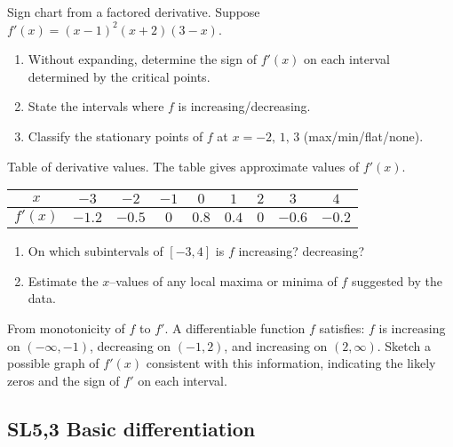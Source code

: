 \documentclass[11pt]{article}
\def\textbf#1{#1}%
\newcommand{\tocsubsection}[1]{\subsection{#1}}
\newcounter{question}
\begin{document}
\begin{question}
\textbf{Sign chart from a factored derivative.}
Suppose $f'(x)=(x-1)^{2}(x+2)(3-x)$.
\begin{enumerate}
  \item Without expanding, determine the sign of $f'(x)$ on each interval determined by the critical points.
  \item State the intervals where $f$ is increasing/decreasing.
  \item Classify the stationary points of $f$ at $x=-2,\,1,\,3$ (max/min/flat/none).
\end{enumerate}
\end{question}

\begin{question}
\textbf{Table of derivative values.}
The table gives approximate values of $f'(x)$.

\begin{center}
\begin{tabular}{c|cccccccc}
$x$ & $-3$ & $-2$ & $-1$ & $0$ & $1$ & $2$ & $3$ & $4$\\\hline
$f'(x)$ & $-1.2$ & $-0.5$ & $0$ & $0.8$ & $0.4$ & $0$ & $-0.6$ & $-0.2$
\end{tabular}
\end{center}

\begin{enumerate}
  \item On which subintervals of $[-3,4]$ is $f$ increasing? decreasing?
  \item Estimate the $x$–values of any local maxima or minima of $f$ suggested by the data.
\end{enumerate}
\end{question}

\begin{question}
\textbf{From monotonicity of $f$ to $f'$.}
A differentiable function $f$ satisfies: $f$ is increasing on $(-\infty,-1)$, decreasing on $(-1,2)$, and increasing on $(2,\infty)$.  
Sketch a possible graph of $f'(x)$ consistent with this information, indicating the likely zeros and the sign of $f'$ on each interval.
\end{question}


\tocsubsection{SL5,3 Basic differentiation}
\end{document}
